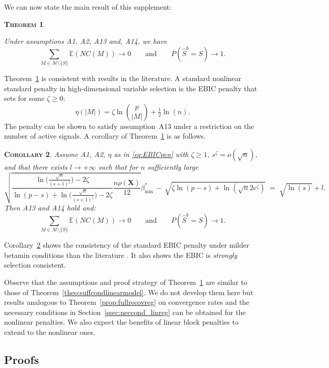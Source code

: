 \documentclass[aos]{imsart}
\theoremstyle{plain}
\newtheorem{thm}{\textsc{Theorem}}[section]
\newtheorem{cor}[thm]{\textsc{Corollary}}
\newcommand{\E}{\mathbb{E}}
\newcommand{\M}{\mathcal{M}}
\newcommand{\bs}{\boldsymbol}
\begin{document}
We can now state the main result of this supplement: 
\begin{thm}\label{theo:suffcondlinearmodelnonlinpen}

Under assumptions A1, A2, A13 and, A14, we have
$$\sum_{M \in \M\setminus \{S\}}\E\left(NC(M)\right)\to 0 \qquad \mbox{and} \qquad P(\hat{S}^b = S) \to 1.$$
\end{thm}
Theorem~\ref{theo:suffcondlinearmodelnonlinpen} is consistent with results in the literature. A standard nonlinear standard penalty in high-dimensional variable selection is the EBIC penalty \cite{EBIC} that sets for some $\zeta\geq 0$:
\begin{equation}\label{eq:EBICpen}
    \eta(|M|)=\zeta\ln{\binom{p}{|M|}} + \tfrac{1}{2}\ln(n).
\end{equation}
The penalty can be shown to satisfy assumption~A13 under a restriction on the number of active signals. A corollary of Theorem~\ref{theo:suffcondlinearmodelnonlinpen} is as follows.
\begin{cor}\label{cor:ebic}
    Assume A1, A2, $\eta$ as in \eqref{eq:EBICpen} with $\zeta\geq1$, $s^{\zeta}=o(\sqrt{n})$, and that there exists $l\to +\infty$ such that for $n$ sufficiently large
    \begin{equation}\label{eq:betaminebic}
        \sqrt{\frac{\ln \big(\tfrac{\sqrt{n}}{(s+1)^{\zeta}}\big)-2\zeta}{\ln(p-s) + \ln \big(\tfrac{\sqrt{n}}{(s+1)^{\zeta}}\big)-2\zeta}\frac{n\rho(\bs X)}{12}}{{\beta_{\min}^*}} \,- \,\sqrt{\zeta\ln(p-s) +\ln(\sqrt{n}2e^{\zeta})} \;=\; \sqrt{\ln(s)} + l .
    \end{equation}
    Then A13 and A14 hold and: $$\sum_{M \in \M\setminus \{S\}}\E\left(NC(M)\right)\to 0 \qquad \mbox{and} \qquad P(\widehat{S}^b = S) \to 1.$$    
\end{cor}
Corollary~\ref{cor:ebic} shows the consistency of the standard EBIC penalty under milder betamin conditions than the literature \cite{EBIC,ebicdiverging}. It also shows the EBIC is \emph{strongly} selection consistent.

Observe that the assumptions and proof strategy of Theorem~\ref{theo:suffcondlinearmodelnonlinpen} are similar to those of Theorem~\ref{theo:suffcondlinearmodel}. We do not develop them here but results analogous to Theorem~\ref{prop:fullrecovreg} on convergence rates and the necessary conditions in Section~\ref{ssec:neccond_linreg} can be obtained for the nonlinear penalties. We also expect the benefits of linear block penalties to extend to the nonlinear ones.
\subsection{Proofs}
\end{document}
